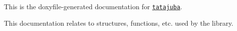 This is the doxyfile-\/generated documentation for \href{https://github.com/quadram-institute-bioscience/tatajuba}{\tt tatajuba}.

This documentation relates to structures, functions, etc. used by the library. 